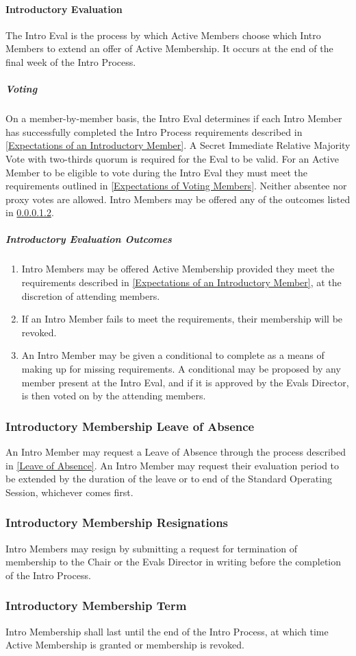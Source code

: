 \documentclass{article}
\newcommand{\asubsection}[1]{\subsubsection{#1} \label{#1}}
\newcommand{\asubsubsection}[1]{\paragraph{#1} \label{#1}}
\newcommand{\asubsubsubsection}[1]{\subparagraph{#1} \label{#1}}
\begin{document}
\asubsubsection{Introductory Evaluation}
The Intro Eval is the process by which Active Members choose which Intro Members to extend an offer of Active Membership.
It occurs at the end of the final week of the Intro Process.

\asubsubsubsection{Voting}
On a member-by-member basis, the Intro Eval determines if each Intro Member has successfully completed the Intro Process requirements described in \ref{Expectations of an Introductory Member}.
A Secret Immediate Relative Majority Vote with two-thirds quorum is required for the Eval to be valid.
For an Active Member to be eligible to vote during the Intro Eval they must meet the requirements outlined in \ref{Expectations of Voting Members}.
Neither absentee nor proxy votes are allowed.
Intro Members may be offered any of the outcomes listed in \ref{Introductory Evaluation Outcomes}.

\asubsubsubsection{Introductory Evaluation Outcomes}
\renewcommand{\theenumi}{\alph{enumi}} %
\begin{enumerate}
	\item Intro Members may be offered Active Membership provided they meet the requirements described in \ref{Expectations of an Introductory Member}, at the discretion of attending members.
	\item If an Intro Member fails to meet the requirements, their membership will be revoked.
	\item An Intro Member may be given a conditional to complete as a means of making up for missing requirements.
	      A conditional may be proposed by any member present at the Intro Eval, and if it is approved by the Evals Director, is then voted on by the attending members.
\end{enumerate}

\asubsection{Introductory Membership Leave of Absence}
An Intro Member may request a Leave of Absence through the process described in \ref{Leave of Absence}.
An Intro Member may request their evaluation period to be extended by the duration of the leave or to end of the Standard Operating Session, whichever comes first.

\asubsection{Introductory Membership Resignations}
Intro Members may resign by submitting a request for termination of membership to the Chair or the Evals Director in writing before the completion of the Intro Process.

\asubsection{Introductory Membership Term}
Intro Membership shall last until the end of the Intro Process, at which time Active Membership is granted or membership is revoked.
\end{document}
